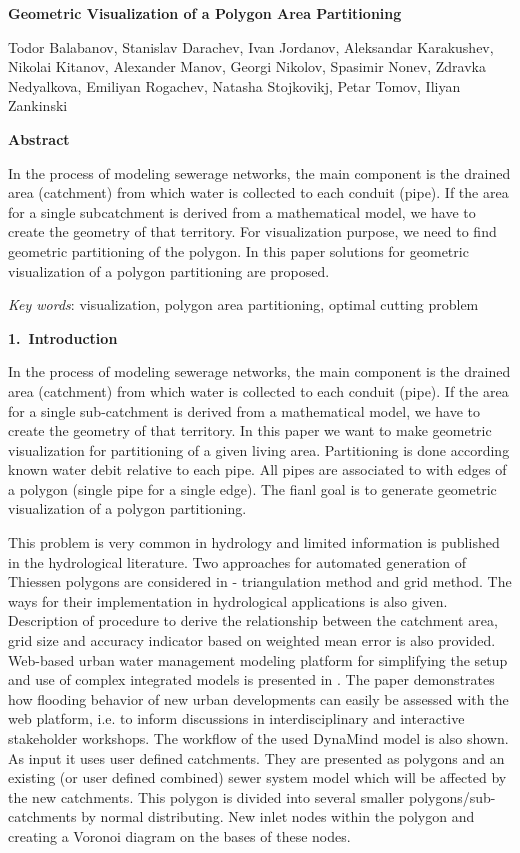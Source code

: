 \documentclass[11pt,leqno]{book}
\newcommand{\sect}[1]{\vskip7mm\par{\large \bf #1}}
\begin{document}
\begin{center}
\textbf{\LARGE Geometric Visualization of a Polygon Area Partitioning}

\vspace*{5mm}

Todor Balabanov,
Stanislav Darachev,
Ivan Jordanov,
Aleksandar Karakushev,
Nikolai Kitanov,
Alexander Manov,
Georgi Nikolov,
Spasimir Nonev,
Zdravka Nedyalkova,
Emiliyan Rogachev,
Natasha Stojkovikj,
Petar Tomov,
Iliyan Zankinski

\end{center}

\date{18-22 Sep 2017}

\sect{Abstract}

In the process of modeling sewerage networks, the main component is the drained area (catchment) from which water is collected to each conduit (pipe). If the area for a single subcatchment is derived from a mathematical model, we have to create the geometry of that territory. For visualization purpose, we need to find geometric partitioning of the polygon. In this paper solutions for geometric visualization of a polygon partitioning are proposed.

\textit{Key words}: visualization, polygon area partitioning, optimal cutting problem

\sect{1.~Introduction}

In the process of modeling sewerage networks, the main component is the drained area (catchment) from which water is collected to each conduit (pipe). If the area for a single sub-catchment is derived from a mathematical model, we have to create the geometry of that territory. In this paper we want to make geometric visualization for partitioning of a given living area. Partitioning is done according known water debit relative to each pipe. All pipes are associated to with edges of a polygon (single pipe for a single edge). The fianl goal is to generate geometric visualization of a polygon partitioning.  

This problem is very common in hydrology and limited information is published in the hydrological literature. Two approaches for automated generation of Thiessen polygons are considered in \cite{han:bra:1} - triangulation method and grid method. The ways for their implementation in hydrological applications is also given. Description of procedure to derive the relationship between the catchment area, grid size and accuracy indicator based on weighted mean error is also provided. Web-based urban water management modeling platform for simplifying the setup and use of complex integrated models is presented in \cite{mai:mik:1}. The paper demonstrates how flooding behavior of new urban developments can easily be assessed with the web platform, i.e. to inform discussions in interdisciplinary and interactive stakeholder workshops. The workflow of the used DynaMind model is also shown. As input it uses user deﬁned catchments. They are presented as polygons and an existing (or user deﬁned combined) sewer system model which will be affected by the new catchments. This polygon is divided into several smaller polygons/sub-catchments by normal distributing. New inlet nodes within the polygon and creating a Voronoi diagram on the bases of these nodes. 
\end{document}
